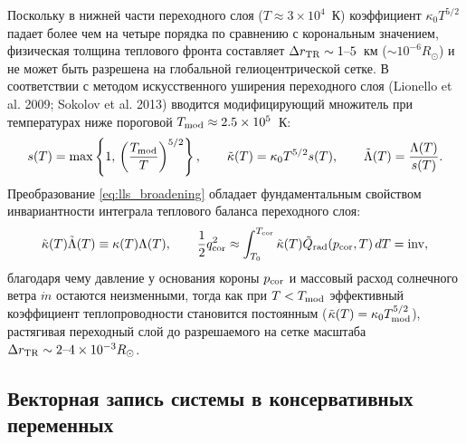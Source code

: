 \documentclass[11pt,a4paper]{article}
\begin{document}
Поскольку в нижней части переходного слоя ($T \approx 3\times 10^4$~К) коэффициент $\kappa_0 T^{5/2}$ падает более чем на четыре порядка по сравнению с корональным значением, физическая толщина теплового фронта составляет $\Delta r_{\rm TR} \sim 1\text{--}5$~км ($\sim 10^{-6} R_\odot$) и не может быть разрешена на глобальной гелиоцентрической сетке. В соответствии с методом искусственного уширения переходного слоя (Lionello et al. 2009; Sokolov et al. 2013) вводится модифицирующий множитель при температурах ниже пороговой $T_{\rm mod} \approx 2.5\times 10^5$~К:
\begin{equation}
s(T) = \max\left\{1,\, \left(\frac{T_{\rm mod}}{T}\right)^{5/2}\right\}, \qquad
\tilde{\kappa}(T) = \kappa_0 T^{5/2} s(T), \qquad
\tilde{\Lambda}(T) = \frac{\Lambda(T)}{s(T)}.
\label{eq:lls_broadening}
\end{equation}
Преобразование \eqref{eq:lls_broadening} обладает фундаментальным свойством инвариантности интеграла теплового баланса переходного слоя:
\begin{equation}
\tilde{\kappa}(T)\tilde{\Lambda}(T) \equiv \kappa(T)\Lambda(T), \qquad
\frac{1}{2}q_{\rm cor}^2 \approx \int_{T_0}^{T_{\rm cor}}\tilde{\kappa}(T)\tilde{Q}_{\rm rad}(p_{\rm cor}, T)\,dT = \mathrm{inv},
\label{eq:lls_invariance}
\end{equation}
благодаря чему давление у основания короны $p_{\rm cor}$ и массовый расход солнечного ветра $\dot{m}$ остаются неизменными, тогда как при $T < T_{\rm mod}$ эффективный коэффициент теплопроводности становится постоянным ($\tilde{\kappa}(T) = \kappa_0 T_{\rm mod}^{5/2}$), растягивая переходный слой до разрешаемого на сетке масштаба $\Delta r_{\rm TR} \sim 2\text{--}4\times 10^{-3} R_\odot$.

\subsection{Векторная запись системы в консервативных переменных}
\end{document}
